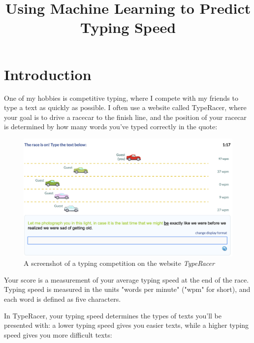 \documentclass[12pt]{article}
\title{Using Machine Learning to Predict Typing Speed\vspace{-3em}}
\author{} %
\date{}
\begin{document}
\maketitle

\section*{Introduction}

One of my hobbies is competitive typing, where I compete with my friends to type a text as quickly as possible. I often use a website called TypeRacer, where your goal is to drive a racecar to the finish line, and the position of your racecar is determined by how many words you've typed correctly in the quote:

\begin{figure}[hbt!]
	\caption{A screenshot of a typing competition on the website \textit{TypeRacer}}
	\includegraphics[width=\textwidth]{typeracer.png}
\end{figure}

Your score is a measurement of your average typing speed at the end of the race. Typing speed is measured in the units "words per minute" ("wpm" for short), and each word is defined as five characters.

In TypeRacer, your typing speed determines the types of texts you'll be presented with: a lower typing speed gives you easier texts, while a higher typing speed gives you more difficult texts:
\end{document}
